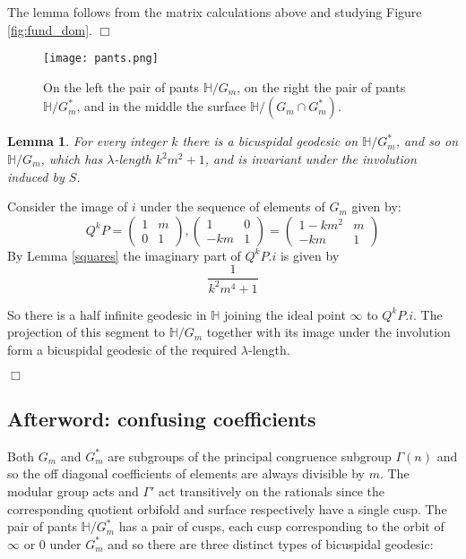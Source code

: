 \documentclass[12pt,a4paper]{amsart}
\newtheorem{lem}[thm]{Lemma}
\def\HH{\mathbb{H}}
\def\GG{G_m}
\begin{document}
\proof The lemma follows from the matrix calculations above and studying Figure
\ref{fig:fund_dom}. \hfill $\Box$

\begin{figure}[ht]
\begin{center}
\texttt{[image: pants.png]}
\end{center}
\caption{On the left the pair of pants $\HH/\GG$,
	on the right  the pair of pants $\HH/\GG^*$,
and in the middle the surface $\HH/(\GG\cap \GG^*)$.}
\label{fig: pants}
\end{figure}

\begin{lem}

	For every integer $k$ there is a bicuspidal geodesic on $\HH/\GG^*$,
	and so on $\HH/\GG$, which has $\lambda$-length $k^2 m^2 +1$, and is
	invariant under the  involution induced by $S$.

\end{lem}

\proof Consider the image of $i$ under the sequence of elements of $\GG$ given by:
$$ Q^kP = 
\begin{pmatrix} 1 & m \\ 0 & 1 \end{pmatrix},\begin{pmatrix} 1 & 0 \\ -km & 1 \end{pmatrix}  
= \begin{pmatrix} 1-km^2 & m \\ -km & 1 \end{pmatrix} $$
By Lemma \ref{squares} the imaginary part of $Q^kP.i$ is given by
$$\frac{1}{ k^2 m^4 + 1}$$

So there is a half infinite geodesic in $\HH$ joining the ideal point $\infty$
to $Q^kP.i$. The projection of this segment to $\HH/\GG$ together with its image
under the involution form a bicuspidal geodesic of the required
$\lambda$-length.

\hfill$\Box$

\subsection{Afterword: confusing coefficients}

Both $\GG$ and $\GG^*$ are subgroups of the principal congruence subgroup
$\Gamma(n)$ and so the off diagonal coefficients of elements are always
divisible by $m$. The modular group acts  and $\Gamma'$ act transitively on the
rationals since the corresponding quotient orbifold and surface respectively
have a single cusp. The pair of pants $\HH/\GG^*$ has a pair of cusps, each
cusp corresponding to the orbit of $\infty$ or $0$ under $\GG^*$ and so there
are three distinct types of bicuspidal geodesic: 
\end{document}
